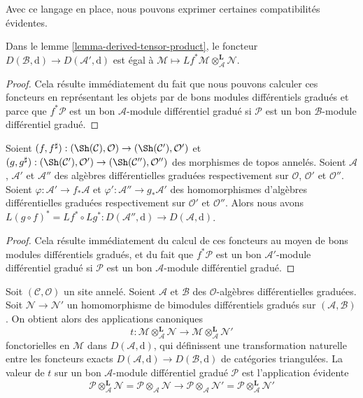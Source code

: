 \noindent
Avec ce langage en place, nous pouvons exprimer certaines compatibilités évidentes.

\begin{lemma}
\label{lemma-compose-pullback-tensor}
Dans le lemme \ref{lemma-derived-tensor-product}, le foncteur
$D(\mathcal{B}, \text{d}) \to D(\mathcal{A}', \text{d})$ est égal
à $\mathcal{M} \mapsto
Lf^*\mathcal{M} \otimes_\mathcal{A}^\mathbf{L} \mathcal{N}$.
\end{lemma}

\begin{proof}
Cela résulte immédiatement du fait que nous pouvons calculer ces
foncteurs en représentant les objets par de bons modules différentiels
gradués et parce que $f^*\mathcal{P}$ est un bon
$\mathcal{A}$-module différentiel gradué si $\mathcal{P}$ est un bon
$\mathcal{B}$-module différentiel gradué.
\end{proof}

\begin{lemma}
\label{lemma-compose-pullback}
Soient $(f, f^\sharp) : (\Sh(\mathcal{C}), \mathcal{O})
\to (\Sh(\mathcal{C}'), \mathcal{O}')$ et
$(g, g^\sharp) : (\Sh(\mathcal{C}'), \mathcal{O}')
\to (\Sh(\mathcal{C}''), \mathcal{O}'')$ des
morphismes de topos annelés. Soient $\mathcal{A}$, $\mathcal{A}'$ et
$\mathcal{A}''$ des algèbres différentielles graduées respectivement sur $\mathcal{O}$,
$\mathcal{O}'$ et $\mathcal{O}''$. Soient
$\varphi : \mathcal{A}' \to f_*\mathcal{A}$ et
$\varphi' : \mathcal{A}'' \to g_*\mathcal{A}'$ des
homomorphismes d'algèbres différentielles graduées respectivement sur $\mathcal{O}'$
et $\mathcal{O}''$.
Alors nous avons $L(g \circ f)^* = Lf^* \circ Lg^*
: D(\mathcal{A}'', \text{d}) \to D(\mathcal{A}, \text{d})$.
\end{lemma}

\begin{proof}
Cela résulte immédiatement du calcul de ces foncteurs au
moyen de bons modules différentiels gradués, et du fait
que $f^*\mathcal{P}$ est un bon
$\mathcal{A}'$-module différentiel gradué si $\mathcal{P}$ est un bon
$\mathcal{A}$-module différentiel gradué.
\end{proof}

\noindent
Soit $(\mathcal{C}, \mathcal{O})$ un site annelé. Soient
$\mathcal{A}$ et $\mathcal{B}$ des $\mathcal{O}$-algèbres différentielles graduées.
Soit $\mathcal{N} \to \mathcal{N}'$ un homomorphisme de bimodules différentiels
gradués sur $(\mathcal{A}, \mathcal{B})$. On obtient alors des applications
canoniques
$$
t
: \mathcal{M} \otimes_\mathcal{A}^\mathbf{L} \mathcal{N}
\longrightarrow
\mathcal{M} \otimes_\mathcal{A}^\mathbf{L} \mathcal{N}'
$$
fonctorielles en $\mathcal{M}$ dans $D(\mathcal{A}, \text{d})$,
qui définissent une transformation naturelle entre les
foncteurs exacts $D(\mathcal{A}, \text{d}) \to D(\mathcal{B}, \text{d})$
de catégories triangulées. La valeur de $t$ sur un bon
$\mathcal{A}$-module différentiel gradué $\mathcal{P}$ est l'application
évidente $$
\mathcal{P} \otimes_\mathcal{A}^\mathbf{L} \mathcal{N}
= \mathcal{P} \otimes_\mathcal{A} \mathcal{N}
\longrightarrow
\mathcal{P} \otimes_\mathcal{A} \mathcal{N}'
= \mathcal{P} \otimes_\mathcal{A}^\mathbf{L} \mathcal{N}'
$$

